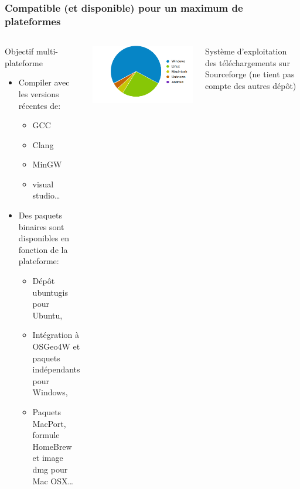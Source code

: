 \documentclass[8pt]{beamer}
\begin{document}
\begin{frame}
\frametitle{Compatible (et disponible) pour un maximum de plateformes}
\begin{columns}
\begin{block}{Objectif multi-plateforme}
\begin{itemize}
\item Compiler avec les versions récentes de:
\begin{itemize}
\item GCC
\item Clang 
\item MinGW
\item visual studio\ldots
\end{itemize}
\item Des paquets binaires sont disponibles en fonction de la plateforme:
\begin{itemize}
\item Dépôt ubuntugis pour Ubuntu,
\item Intégration à OSGeo4W et paquets indépendants pour Windows,
\item Paquets MacPort, formule HomeBrew et image dmg pour Mac OSX\ldots
\end{itemize}
\end{itemize}
\end{block}
\includegraphics[width=\textwidth]{images/OTB4_download_sourceforge_os_crop.png}
\begin{center}
\tiny{Système d'exploitation des téléchargements sur Sourceforge (ne tient pas compte des autres dépôt)}
\end{center}
\end{columns}
\end{frame}
\end{document}
